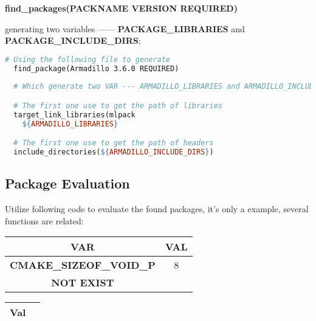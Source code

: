 \documentclass[11pt]{article}
\begin{document}
\textbf{find\_packages(PACKNAME VERSION REQUIRED)}

generating two variables ------ \textbf{PACKAGE\_LIBRARIES} and \textbf{PACKAGE\_INCLUDE\_DIRS};


\begin{lstlisting}[language=make,label=lst:9lst,caption=Pacakge getting]
  # Using the following file to generate 
  find_package(Armadillo 3.6.0 REQUIRED)
 
  # Which generate two VAR --- ARMADILLO_LIBRARIES and ARMADILLO_INCLUDE_DIRS

  # The first one use to get the path of libraries
  target_link_libraries(mlpack
    ${ARMADILLO_LIBRARIES}

  # The first one use to get the path of headers
  include_directories(${ARMADILLO_INCLUDE_DIRS})
\end{lstlisting}


\subsection{Package Evaluation}
\label{sub:package_evaluation}

Utilize following code to evaluate the found packages, it's only a example, several functions are related:

\begin{center}
  \begin{tabular}{|c|c|}
    \hline
     \textbf{VAR} &  \textbf{VAL} \\
    \hline
     \textbf{CMAKE\_SIZEOF\_VOID\_P} &  8  \\
    \hline
    \textbf{NOT EXIST}
    \hline
  \end{tabular}
\end{center}

\begin{center}
  \begin{tabular}{|c|c|}
    \hline
     \textbf{Val} &  \textbf{} \\
    \hline
    \hline
  \end{tabular}
\end{center}
\end{document}

